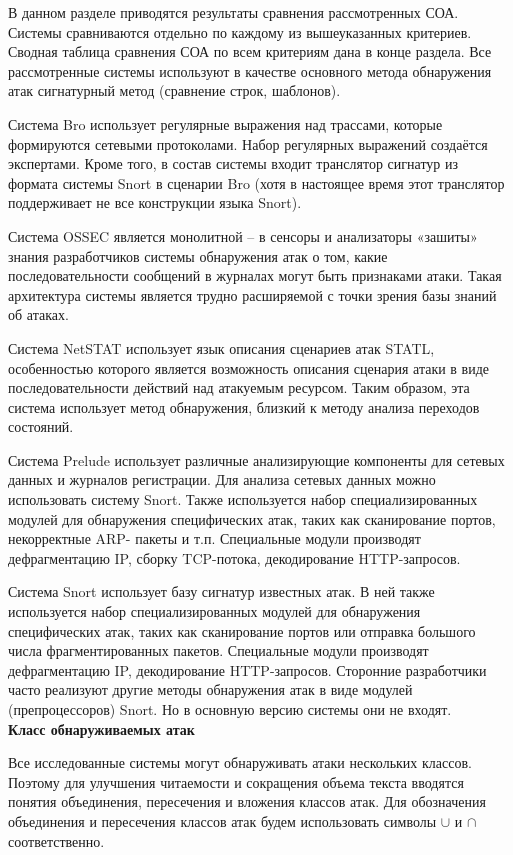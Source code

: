 В данном разделе приводятся результаты сравнения рассмотренных СОА. Системы
сравниваются отдельно по каждому из вышеуказанных критериев.
Сводная таблица сравнения СОА по всем критериям дана в конце раздела.
Все рассмотренные системы используют в качестве основного метода обнаружения
атак сигнатурный метод (сравнение строк, шаблонов).

Система Bro \cite{bib:bro} использует регулярные выражения над трассами, которые
формируются сетевыми протоколами. Набор регулярных выражений создаётся
экспертами. Кроме того, в состав системы входит транслятор сигнатур из формата
системы Snort в сценарии Bro (хотя в настоящее время этот транслятор поддерживает
не все конструкции языка Snort).

Система OSSEC \cite{bib:ossec} является монолитной – в сенсоры и анализаторы «зашиты» знания
разработчиков системы обнаружения атак о том, какие последовательности сообщений
в журналах могут быть признаками атаки. Такая архитектура системы является трудно
расширяемой с точки зрения базы знаний об атаках.

Система NetSTAT \cite{bib:netstat} использует язык описания сценариев атак STATL, особенностью
которого является возможность описания сценария атаки в виде последовательности
действий над атакуемым ресурсом. Таким образом, эта система использует метод
обнаружения, близкий к методу анализа переходов состояний.

Система Prelude \cite{bib:prelude} использует различные анализирующие компоненты для сетевых
данных и журналов регистрации. Для анализа сетевых данных можно использовать
систему Snort. Также используется набор специализированных модулей для
обнаружения специфических атак, таких как сканирование портов, некорректные ARP-
пакеты и т.п. Специальные модули производят дефрагментацию IP, сборку TCP-потока,
декодирование HTTP-запросов.

Система Snort \cite{bib:snort} использует базу сигнатур известных атак. В ней также используется
набор специализированных модулей для обнаружения специфических атак, таких как
сканирование портов или отправка большого числа фрагментированных пакетов.
Специальные модули производят дефрагментацию IP, декодирование HTTP-запросов.
Сторонние разработчики часто реализуют другие методы обнаружения атак в виде
модулей (препроцессоров) Snort. Но в основную версию системы они не входят.\\

\textbf{Класс обнаруживаемых атак}

Все исследованные системы могут обнаруживать атаки нескольких классов.
Поэтому для улучшения читаемости и сокращения объема текста вводятся понятия
объединения, пересечения и вложения классов атак. Для обозначения объединения и
пересечения классов атак будем использовать символы $\cup$ и $\cap$ соответственно.

